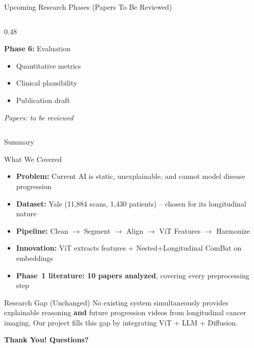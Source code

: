 \documentclass[aspectratio=169,xcolor=dvipsnames]{beamer}
\begin{document}
\begin{frame}{Upcoming Research Phases (Papers To Be Reviewed)}
\begin{columns}
\begin{column}{0.48\textwidth}
            \vspace{0.3em}

            \begin{block}{\textbf{Phase 6:} Evaluation}
                \small
                \begin{itemize}
                    \item Quantitative metrics
                    \item Clinical plausibility
                    \item Publication draft
                \end{itemize}
                \vspace{0.2em}
                {\scriptsize \textit{Papers: to be reviewed}}
            \end{block}
        \end{column}
    \end{columns}
\end{frame}

\begin{frame}{Summary}
    \begin{block}{What We Covered}
        \small
        \begin{itemize}
            \item \textbf{Problem:} Current AI is static, unexplainable, and cannot model disease progression
            \item \textbf{Dataset:} Yale (11,884 scans, 1,430 patients) -- chosen for its longitudinal nature
            \item \textbf{Pipeline:} Clean $\to$ Segment $\to$ Align $\to$ ViT Features $\to$ Harmonize
            \item \textbf{Innovation:} ViT extracts features + Nested+Longitudinal ComBat on embeddings
            \item \textbf{Phase~1 literature: 10 papers analyzed}, covering every preprocessing step
        \end{itemize}
    \end{block}

    \begin{alertblock}{Research Gap (Unchanged)}
        \small
        No existing system simultaneously provides explainable reasoning \textbf{and} future progression videos from longitudinal cancer imaging. Our project fills this gap by integrating ViT + LLM + Diffusion.
    \end{alertblock}

    \vspace{0.5em}

    \centering
    \Large \textbf{Thank You! Questions?}
\end{frame}
\end{document}
